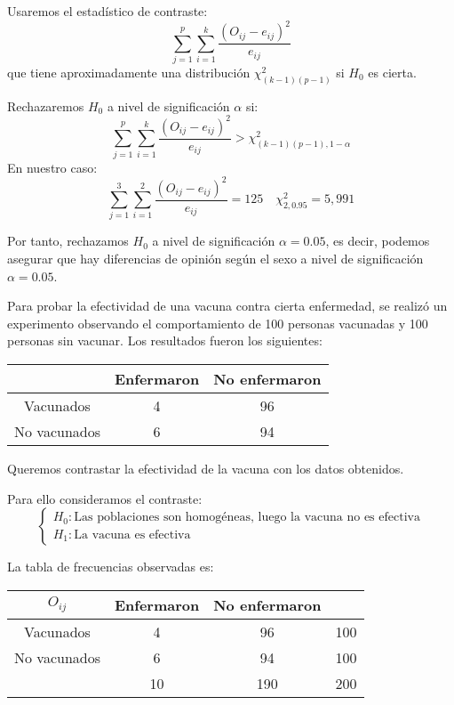 \begin{exercise}
    Usaremos el estadístico de contraste:
    $$\sum_{j=1}^p \sum_{i=1}^k \frac{(O_{ij}-e_{ij})^2}{e_{ij}}$$
    que tiene aproximadamente una distribución $\chi^2_{(k-1)(p-1)}$ si $H_0$ es cierta.

    Rechazaremos $H_0$ a nivel de significación $\alpha$ si:
    $$\sum_{j=1}^p \sum_{i=1}^k \frac{(O_{ij}-e_{ij})^2}{e_{ij}} > \chi^2_{(k-1)(p-1), 1-\alpha}$$
    En nuestro caso:
    $$\sum_{j=1}^3 \sum_{i=1}^2 \frac{(O_{ij}-e_{ij})^2}{e_{ij}} = 125 \quad \chi^2_{2, 0.95} = 5,991$$

    Por tanto, rechazamos $H_0$ a nivel de significación $\alpha = 0.05$, es decir, podemos asegurar que hay diferencias de opinión según el sexo a nivel de significación $\alpha = 0.05$.
\end{exercise}

\begin{exercise}
    Para probar la efectividad de una vacuna contra cierta enfermedad, se realizó un experimento observando el comportamiento de 100 personas vacunadas y 100 personas sin vacunar.
    Los resultados fueron los siguientes:
    \begin{center}
        \begin{tabular}{| c | c c |}
            \hline
                         & Enfermaron & No enfermaron \\
            \hline
            Vacunados    & 4          & 96            \\
            No vacunados & 6          & 94            \\
            \hline
        \end{tabular}
    \end{center}
    Queremos contrastar la efectividad de la vacuna con los datos obtenidos.

    Para ello consideramos el contraste:
    $$\begin{cases}
            H_0: \text{Las poblaciones son homogéneas, luego la vacuna no es efectiva} \\
            H_1: \text{La vacuna es efectiva}
        \end{cases}$$

    La tabla de frecuencias observadas es:
    \begin{center}
        \begin{tabular}{| c | c c | c |}
            \hline
            $O_{ij}$     & Enfermaron & No enfermaron &     \\
            \hline
            Vacunados    & 4          & 96            & 100 \\
            No vacunados & 6          & 94            & 100 \\
            \hline
                         & 10         & 190           & 200 \\
            \hline
        \end{tabular}
    \end{center}


\end{exercise}

